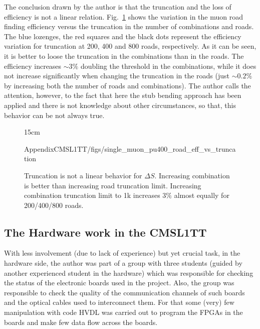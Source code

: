 The conclusion drawn by the author is that the truncation and the loss of efficiency is not a linear relation. Fig.~\ref{fig:deltaS_truncation} shows the variation in the muon road finding efficiency versus the truncation in the number of combinations and roads. The blue lozenges, the red squares and the black dots represent the efficiency variation for truncation at 200, 400 and 800 roads, respectively. As it can be seen, it is better to loose the truncation in the combinations than in the roads. The efficiency increases $\sim 3\%$ doubling the threshold in the combinations, while it does not increase significantly when changing the truncation in the roads (just $\sim 0.2\%$ by increasing both the number of roads and combinations). The author calls the attention, however, to the fact that here the stub bending approach has been applied and there is not knowledge about other circumstances, so that, this behavior can be not always true.

\begin{figure}[htbp]{15cm}
	\caption{Truncation is not a linear behavior for $\Delta S$. Increasing combination is better than increasing road truncation limit. Increasing combination truncation limit to 1k increases 3$\%$ almost equally for 200/400/800 roads.}
	\centering
	\begin{overpic}
		[scale=0.6]{AppendixCMSL1TT/figs/single_muon_pu400_road_eff_vs_truncation}
	\end{overpic}
	\label{fig:deltaS_truncation}
\end{figure}


\subsection{The Hardware work in the CMSL1TT \label{sec:hardware_work}}
With less involvement (due to lack of experience) but yet crucial task, in the hardware side, the author was part of a group with three students (guided by another experienced student in the hardware) which was responsible for checking the status of the electronic boards used in the project. Also, the group was responsible to check the quality of the communication channels of such boards and the optical cables used to interconnect them. For that some (very) few manipulation with code HVDL was carried out to program the FPGAs in the boards and make few data flow across the boards.

